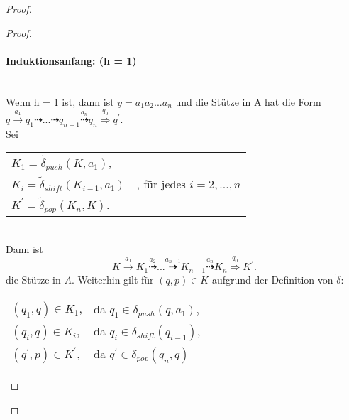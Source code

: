 \begin{proof}
\begin{proof}
\paragraph{Induktionsanfang: (h = 1)}\ \\
Wenn h = 1 ist, dann ist $y = a_1a_2...a_n$ und die Stütze in A hat die Form $q  \stackrel{a_1}{\rightarrow} q_1 \dashrightarrow ... \dashrightarrow q_{n-1} \stackrel{a_n}{\dashrightarrow} q_n \stackrel {q_0} {\Rightarrow} q^\prime$.\\[1,5ex] Sei \\[1ex]
\begin{tabular}[c]{l}
$K_1=\tilde{\delta}_{push}(K, a_1)$,\\
$K_i=\tilde{\delta}_{shift}(K_{i-1}, a_1)\quad$, für jedes $i=2,...,n$\\
$K^\prime = \tilde{\delta}_{pop}(K_n, K)$.
\end{tabular}
\\[1,5ex]Dann ist
\begin{equation*}
K\stackrel{a_1}{\rightarrow} K_1 \stackrel{a_2}{\dashrightarrow} ... \stackrel{a_{n-1}}{\dashrightarrow} K_{n-1} \stackrel{a_n}{\dashrightarrow} K_n \stackrel {q_0} {\Rightarrow} K^\prime. 
\end{equation*}
die Stütze in $\tilde{A}$. Weiterhin gilt für $(q,p) \in K$ aufgrund der Definition von $\tilde{\delta}$:\\
\begin{tabular}{l l}
$(q_1,q) \in K_1$, & da $q_1 \in \delta_{push}(q, a_1)$, \\
$(q_i, q) \in K_i$, & da $q_i \in \delta_{shift}(q_{i-1})$, \\
$(q^\prime, p) \in K^\prime$, & da $q^\prime \in \delta_{pop}(q_n, q)$ 
\end{tabular}

\end{proof}
\end{proof}
